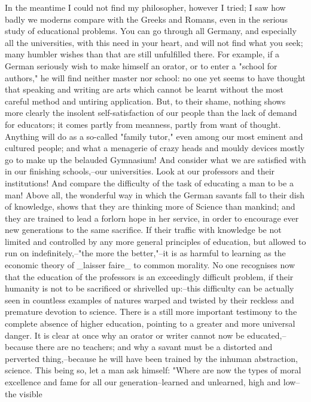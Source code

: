 In the meantime I could not find my philosopher, however I tried; I
saw how badly we moderns compare with the Greeks and Romans, even in
the serious study of educational problems. You can go through all
Germany, and especially all the universities, with this need in your
heart, and will not find what you seek; many humbler wishes than that
are still unfulfilled there. For example, if a German seriously wish
to make himself an orator, or to enter a "school for authors," he
will find neither master nor school: no one yet seems to have thought
that speaking and writing are arts which cannot be learnt without the
most careful method and untiring application. But, to their shame,
nothing shows more clearly the insolent self-satisfaction of our
people than the lack of demand for educators; it comes partly from
meanness, partly from want of thought. Anything will do as a
so-called "family tutor," even among our most eminent and cultured
people; and what a menagerie of crazy heads and mouldy devices mostly
go to make up the belauded Gymnasium! And consider what we are
satisfied with in our finishing schools,--our universities. Look at
our professors and their institutions! And compare the difficulty of
the task of educating a man to be a man! Above all, the wonderful way
in which the German savants fall to their dish of knowledge, shows
that they are thinking more of Science than mankind; and they are
trained to lead a forlorn hope in her service, in order to encourage
ever new generations to the same sacrifice. If their traffic with
knowledge be not limited and controlled by any more general
principles of education, but allowed to run on indefinitely,--"the
more the better,"--it is as harmful to learning as the economic
theory of _laisser faire_ to common morality. No one recognises now
that the education of the professors is an exceedingly difficult
problem, if their humanity is not to be sacrificed or shrivelled
up:--this difficulty can be actually seen in countless examples of
natures warped and twisted by their reckless and premature devotion
to science. There is a still more important testimony to the complete
absence of higher education, pointing to a greater and more universal
danger. It is clear at once why an orator or writer cannot now be
educated,--because there are no teachers; and why a savant must be a
distorted and perverted thing,--because he will have been trained by
the inhuman abstraction, science. This being so, let a man ask
himself: "Where are now the types of moral excellence and fame for
all our generation--learned and unlearned, high and low--the visible
